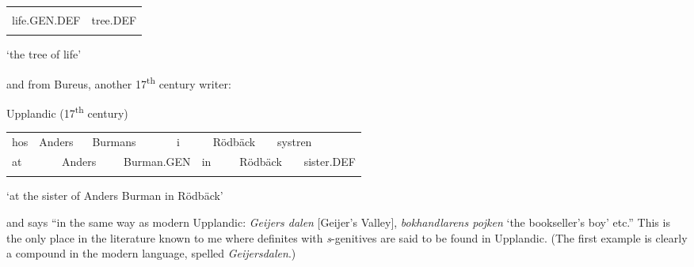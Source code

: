 \begin{tabular}{ll}
\lsptoprule
\multicolumn{2}{l}{Lijffzens

}\\
life.GEN.DEF & tree.DEF\\
\lspbottomrule
\end{tabular}

\begin{styleTranslation}
 ‘the tree of life’

\end{styleTranslation}

and from Bureus, another 17\textsuperscript{th} century writer:

\begin{listWWNumileveli}
\item {}

\begin{styleExample}
Upplandic (17\textsuperscript{th} century)

\end{styleExample}

\end{listWWNumileveli}

\begin{tabular}{llllllllllll}
\lsptoprule
hos & \multicolumn{2}{l}{Anders

} & \multicolumn{2}{l}{Burmans

} & \multicolumn{2}{l}{i

} & \multicolumn{2}{l}{Rödbäck

} & \multicolumn{2}{l}{systren

} & \\
\multicolumn{2}{l}{at

} & \multicolumn{2}{l}{Anders

} & \multicolumn{2}{l}{Burman.GEN

} & \multicolumn{2}{l}{in

} & \multicolumn{2}{l}{Rödbäck

} & \multicolumn{2}{l}{sister.DEF

}\\
\lspbottomrule
\end{tabular}

\begin{styleTranslation}
‘at the sister of Anders Burman in Rödbäck’

\end{styleTranslation}

\begin{styleBodyTextFirst}
and says “in the same way as modern Upplandic: \textit{Geijers dalen }[Geijer’s Valley], \textit{bokhandlarens pojken} ‘the bookseller’s boy’ etc.” This is the only place in the literature known to me where definites with \textit{s}{}-genitives are said to be found in Upplandic. (The first example is clearly a compound in the modern language, spelled \textit{Geijersdalen}.)

\end{styleBodyTextFirst}


